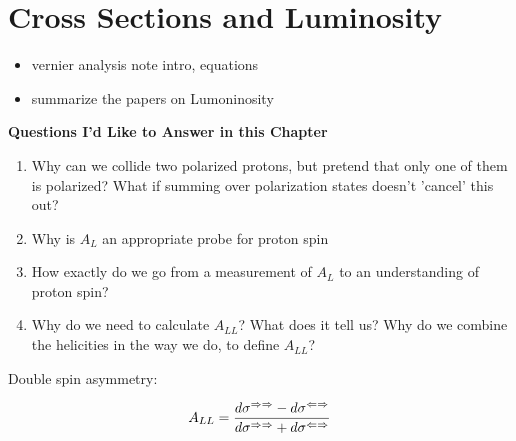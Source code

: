 \section{Cross Sections and Luminosity}
\begin{itemize}
		\item vernier analysis note intro, equations
		\item summarize the papers on Lumoninosity
\end{itemize}

\textbf{Questions I'd Like to Answer in this Chapter}
\begin{enumerate}
    \item Why can we collide two polarized protons, but pretend that only one of
      them is polarized? What if summing over polarization states doesn't
      'cancel' this out?
    \item Why is $A_L$ an appropriate probe for proton spin
    \item How exactly do we go from a measurement of $A_L$ to an understanding
      of proton spin?
    \item Why do we need to calculate $A_{LL}$? What does it tell us? Why do we
      combine the helicities in the way we do, to define $A_{LL}$?
\end{enumerate}

Double spin asymmetry:

\begin{equation}
  A_{LL} = {
    {d\sigma^{\Rightarrow\Rightarrow}-d\sigma^{\Leftarrow\Rightarrow}}
    \over
    {d\sigma^{\Rightarrow\Rightarrow}+d\sigma^{\Leftarrow\Rightarrow}}
  }
\end{equation}
\clearpage
